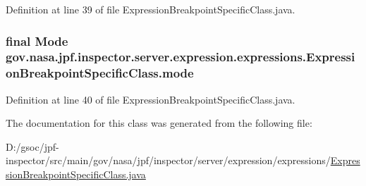 Definition at line 39 of file Expression\+Breakpoint\+Specific\+Class.\+java.

\subsubsection[{\texorpdfstring{mode}{mode}}]{\setlength{\rightskip}{0pt plus 5cm}final {\bf Mode} gov.\+nasa.\+jpf.\+inspector.\+server.\+expression.\+expressions.\+Expression\+Breakpoint\+Specific\+Class.\+mode\hspace{0.3cm}{\ttfamily [private]}}\hypertarget{classgov_1_1nasa_1_1jpf_1_1inspector_1_1server_1_1expression_1_1expressions_1_1_expression_breakpoint_specific_class_ac70d09d536230778d1ab30771e399824}{}\label{classgov_1_1nasa_1_1jpf_1_1inspector_1_1server_1_1expression_1_1expressions_1_1_expression_breakpoint_specific_class_ac70d09d536230778d1ab30771e399824}


Definition at line 40 of file Expression\+Breakpoint\+Specific\+Class.\+java.



The documentation for this class was generated from the following file\+:\begin{DoxyCompactItemize}
\item 
D\+:/gsoc/jpf-\/inspector/src/main/gov/nasa/jpf/inspector/server/expression/expressions/\hyperlink{_expression_breakpoint_specific_class_8java}{Expression\+Breakpoint\+Specific\+Class.\+java}\end{DoxyCompactItemize}

